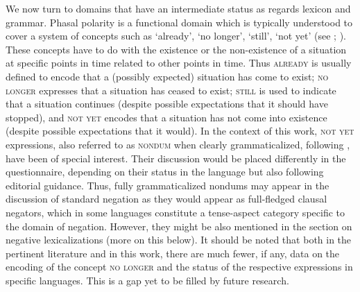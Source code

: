 \documentclass[output=paper,colorlinks,citecolor=brown]{langscibook}
\begin{document}
We now turn to domains that have an intermediate status as regards lexicon and grammar. Phasal polarity is a functional domain which is typically understood to cover a system of concepts such as `already', `no longer', `still', `not yet'
(see \cite{Auwera1998}; \cite{vanBaar1997}). These concepts have to do with the existence or the non-existence of a situation at specific points in time related to other points in time. Thus \textsc{already} is usually defined to encode that a (possibly expected) situation has come to exist; \textsc{no longer}  expresses that a situation has ceased to exist; \textsc{still} is used to indicate that a situation continues (despite possible expectations that it should have stopped), and \textsc{not yet} encodes that a situation has not come into existence (despite possible expectations that it would). In the context of this work, \textsc{not yet} expressions, also referred to as \textsc{nondum} when clearly grammaticalized, following \citet{VeselinovaDevos2021}, have been of special interest. Their discussion would be placed differently in the questionnaire, depending on their status in the language but also following editorial guidance. Thus, fully grammaticalized nondums may appear in the discussion of standard negation as they would appear as full-fledged clausal negators, which in some languages constitute a tense-aspect category specific to the domain of negation. However, they might be also mentioned in the section on negative lexicalizations (more on this below). It should be noted that both in the pertinent literature and in this work, there are much fewer, if any, data on the encoding of the concept \textsc{no longer} and the status of the respective expressions in specific languages. This is a gap yet to be filled by future research.
\end{document}
